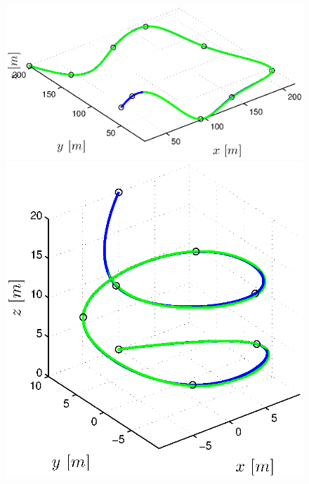 \begin{figure}[H]
\begin{minipage}[t]{0.32\textwidth}
  \end{minipage}
  \vspace{5pt}
  \begin{minipage}[t]{0.32\textwidth}
    \includegraphics[width = \textwidth]{trackings/figure_3D_road_SplineDegree3_crossTrack_Disturbance_1}
  \end{minipage}
  \hfill
  \begin{minipage}[t]{0.32\textwidth}
    \includegraphics[width = \textwidth]{trackings/figure_3D_helix_SplineDegree3_crossTrack_Disturbance_1}
  \end{minipage}
  \hfill
  \begin{minipage}[t]{0.32\textwidth}

\end{minipage}
\end{figure}
